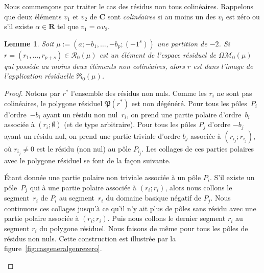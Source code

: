 \documentclass[11pt]{article}
\numberwithin{equation}{section}\renewcommand{\proofname}{Démonstration}
\let\mathcal\mathscr
\newcommand{\RR}{\mathbf{R}}
\newcommand{\CC}{\mathbf{C}}
\newcommand{\appres}[1][g]{\mathfrak{R}_{#1}}
\newcommand{\espres}[1][g]{\mathcal{R}_{#1}}
\newcommand{\omoduli}[1][g]{{\Omega\mathcal M}_{\!#1}}
\newtheorem{lem}[thm]{Lemme}
\theoremstyle{definition}
\begin{document}
Nous commençons par traiter le cas des résidus non tous colinéaires. Rappelons que deux éléments $v_{1}$ et $v_{2}$ de $\CC$ sont \emph{colinéaires} si au moins un des $v_{i}$ est zéro ou s'il existe $\alpha\in \RR$ tel que $v_{1} = \alpha v_{2}$.
\begin{lem}\label{lem:gzerogen1}
Soit $\mu:=(a;-b_{1},\dots,-b_{p};(-1^{s}))$ une partition de $-2$. Si $r=(r_{1}, \dots , r_{p+s})\in\espres[0](\mu)$ est un élément de l'espace résiduel de $\omoduli[0](\mu)$ qui possède au moins deux éléments non colinéaires, alors $r$ est dans l’image de l'application résiduelle $\appres[0](\mu)$.
\end{lem}

\begin{proof}
Notons par $r^{\ast}$ l'ensemble des résidus non nuls.
Comme les $r_{i}$ ne sont pas colinéaires, le polygone résiduel $\mathfrak{P}(r^{\ast})$ est non dégénéré. Pour tous les pôles~$P_{i}$ d'ordre~$-b_{i}$ ayant un résidu non nul~$r_{i}$, on prend une partie polaire d'ordre~$b_{i}$ associée à $(r_{i};\emptyset)$ (et de type arbitraire). Pour tous les pôles $P_{j}$ d'ordre $-b_{j}$ ayant un résidu nul, on prend une partie triviale d'ordre $b_{j}$ associée à $(r_{i_{j}};r_{i_{j}})$, où $r_{i_{j}}\neq0$ est le résidu (non nul) au pôle $P_{i_{j}}$. Les collages de ces parties polaires avec le polygone résiduel se font de la façon suivante.

Étant donnée une partie polaire non triviale associée à un pôle $P_{i}$. S'il existe un pôle~$P_{j}$ qui à une partie polaire associée à $(r_{i};r_{i})$, alors nous collons le segment~$r_{i}$ de $P_{i}$ au segment~$r_{i}$ du domaine basique négatif de $P_{j}$. Nous continuons ces collages jusqu'à ce qu'il n'y ait plus de pôles sans résidu avec une partie polaire associée à $(r_{i};r_{i})$. Puis nous collons le dernier segment $r_{i}$ au segment $r_{i}$ du polygone résiduel. Nous faisons de même pour tous les pôles de résidus non nuls. Cette construction est illustrée par la figure~\ref{fig:casgeneralgenrezero}.

\begin{figure}[htb]
\center
{}
\end{figure}
\end{proof}
\end{document}
